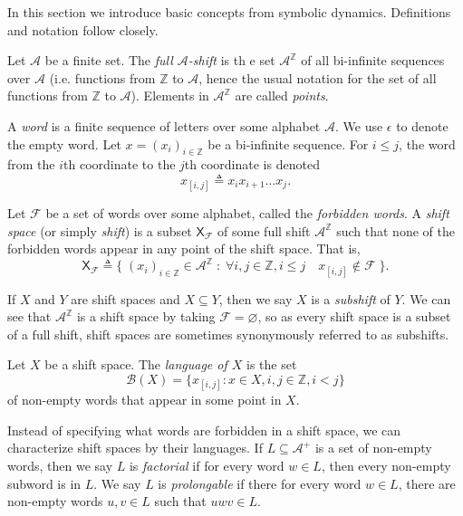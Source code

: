\documentclass[hidelinks]{article}
\newcommand{\Ac}{\mathcal{A}}  %
\newcommand{\Bc}{\mathcal{B}}
\newcommand{\Fc}{\mathcal{F}}
\newcommand{\shift}[1]{\mathsf{X}_{#1}}
\newcommand{\term}[1]{\textit{#1}}
\theoremstyle{definition}
\begin{document}
In this section we introduce basic concepts from symbolic dynamics. 
Definitions and notation follow \cite{lind1995introduction} closely.

\begin{definition}
    Let \(\Ac\) be a finite set. The \term{full \(\Ac\)-shift} is th e set \(\Ac^\mathbb{Z}\) of all 
    bi-infinite sequences over \(\Ac\) (i.e. functions from \(\mathbb{Z}\) to \(\Ac\), hence the 
    usual notation for the set of all functions from \(\mathbb{Z}\) to \(\Ac\)).
    Elements in \(\Ac^\mathbb{Z}\) are called \term{points}.
\end{definition}

A \term{word} is a finite sequence of letters over some alphabet \(\Ac\). We use 
\(\epsilon\) to denote the empty word.
Let \(x=(x_i)_{i \in \mathbb{Z}}\) be a bi-infinite sequence. For \(i \leq j\), the word from the 
\(i\)th coordinate to the \(j\)th coordinate is denoted \[x_{[i,j]} \triangleq x_i x_{i+1} \dots x_{j}.\]

\begin{definition}
    Let \(\Fc\) be a set of words over some alphabet, called the \term{forbidden words}.
    A \term{shift space} (or simply \term{shift}) is a subset \(\shift{\Fc}\)
    of some full shift \(\Ac^\mathbb{Z}\) such that none of the forbidden words appear in any point of the shift space.
    That is,
    \[\shift{\Fc} \triangleq \big\{ \; (x_i)_{i \in \mathbb{Z}} \in \Ac^\mathbb{Z} \; : \; \forall i, j \in \mathbb{Z}, i\leq j \quad  x_{[i,j]} \notin \Fc \; \big\}.\]
\end{definition}

If \(X\) and \(Y\) are shift spaces and \(X \subseteq Y\), then we say \(X\) is a \term{subshift} of \(Y\).
We can see that \(\Ac^\mathbb{Z}\) is a shift space by taking \(\Fc = \varnothing\), so as 
every shift space is a subset of a full shift, shift spaces are sometimes synonymously referred to 
as subshifts.

\begin{definition}
    Let \(X\) be a shift space. The \term{language of \(X\)} is the set 
    \[\Bc(X) = \{ x_{[i,j]} : x \in X, i, j \in \mathbb{Z}, i < j\}\]
    of non-empty words that appear in some point in \(X\).
\end{definition}

Instead of specifying what words are forbidden in a shift space, we can characterize 
shift spaces by their languages. If \(L \subseteq \Ac^+\) is a set of non-empty words, then 
we say \(L\) is \term{factorial} if for every word \(w \in L\), then every non-empty subword 
is in \(L\). We say \(L\) is \term{prolongable} if there for every word \(w \in L\), 
there are non-empty words \(u, v \in L\) such that \(uwv \in L\).
\end{document}

